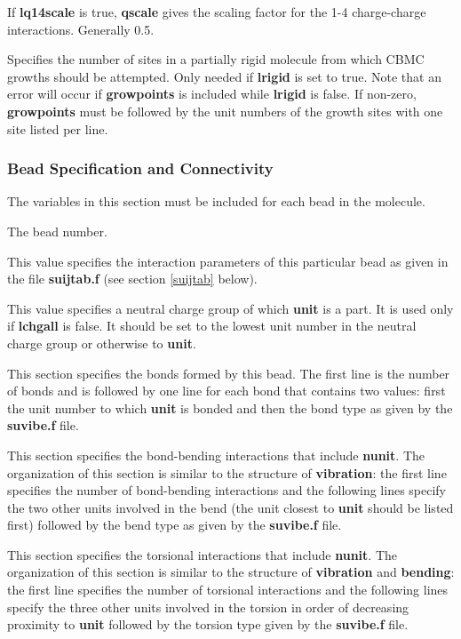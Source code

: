 \documentclass[12pt,letterpaper]{article}
\begin{document}
 If {\textbf{lq14scale}} is true, {\textbf{qscale}} gives the scaling factor
for the 1-4 charge-charge interactions.  Generally 0.5.

 Specifies the number of sites in a partially rigid molecule 
from which CBMC growths should be attempted.  
Only needed if {\textbf{lrigid}} is set to true. 
Note that an error will occur if {\textbf{growpoints}} is included while {\textbf{lrigid}} is false.
If non-zero, {\textbf{growpoints}} must be followed by the unit numbers
of the growth sites with one site listed per line.

\subsubsection{Bead Specification and Connectivity}
\label{beadspec}
The variables in this section must be included for each bead in the molecule.

 The bead number.

 This value specifies the interaction parameters of this
particular bead as given in the file {\textbf{suijtab.f}} (see section \ref{suijtab} below).

 This value specifies a neutral charge group of which {\textbf{unit}} is a part.  
It is used only if {\textbf{lchgall}} is false.
It should be set to the lowest unit number in the neutral charge group 
or otherwise to {\textbf{unit}}.

 This section specifies the bonds formed by this bead.
The first line is the number of bonds and is followed by one line for each bond
that contains two values: first the unit number to which {\textbf{unit}} is bonded 
and then the bond type as given by the {\textbf{suvibe.f}} file.

 This section specifies the bond-bending
interactions that include {\textbf{nunit}}.  The organization of this section is similar 
to the structure of {\textbf{vibration}}:
the first line specifies the number of bond-bending interactions and 
the following lines specify the two other units involved in the bend (the unit closest to {\textbf{unit}} 
should be listed first) followed by the bend type as given by the {\textbf{suvibe.f}} file.

 This section specifies the torsional interactions 
that include {\textbf{nunit}}.  The organization of this section is similar 
to the structure of {\textbf{vibration}} and {\textbf{bending}}:
the first line specifies the number of torsional interactions and 
the following lines specify the three other units involved in the torsion 
in order of decreasing proximity to {\textbf{unit}} followed by the torsion type given by
the {\textbf{suvibe.f}} file.
\end{document}
